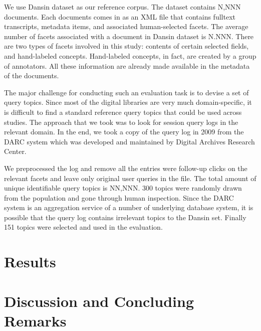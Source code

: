 We use Dansin dataset as our reference corpus.  The dataset contains N,NNN
documents.  Each documents comes in as an XML file that contains fulltext
transcripts, metadata items, and associated human-selected facets.  The average
number of facets associated with a document in Dansin dataset is N.NNN.  There
are two types of facets involved in this study: contents of certain selected
fields, and hand-labeled concepts.  Hand-labeled concepts, in fact, are created
by a group of annotators.  All these information are already made available in
the metadata of the documents.

The major challenge for conducting such an evaluation task is to devise a set
of query topics.  Since most of the digital libraries are very much
domain-specific, it is difficult to find a standard reference query topics that
could be used across studies.  The approach that we took was to look for
session query logs in the relevant domain.  In the end, we took a copy of the
query log in 2009 from the DARC system which was developed and maintained by
Digital Archives Research Center.  

We preprocessed the log and remove all the entries were follow-up clicks on the
relevant facets and leave only original user queries in the file.  The total
amount of unique identifiable query topics is NN,NNN.  300 topics were randomly
drawn from the population and gone through human inspection.  Since the DARC
system is an aggregation service of a number of underlying database system, it
is possible that the query log contains irrelevant topics to the Dansin set.
Finally 151 topics were selected and used in the evaluation.


\section{Results}


\section{Discussion and Concluding Remarks}

